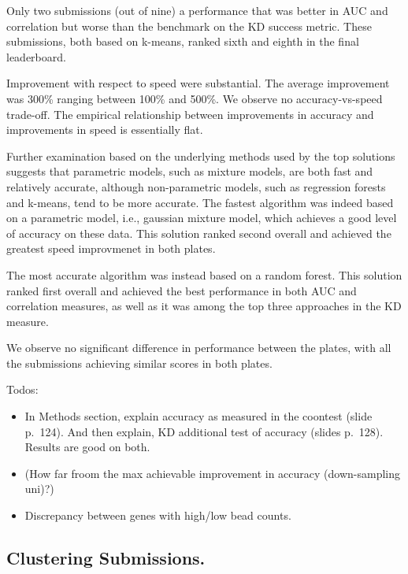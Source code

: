 \documentclass[]{article}
\providecommand{\tightlist}{%
  \setlength{\itemsep}{0pt}\setlength{\parskip}{0pt}}
\begin{document}
Only two submissions (out of nine) a performance that was better in AUC
and correlation but worse than the benchmark on the KD success metric.
These submissions, both based on k-means, ranked sixth and eighth in the
final leaderboard.

Improvement with respect to speed were substantial. The average
improvement was 300\% ranging between 100\% and 500\%. We observe no
accuracy-vs-speed trade-off. The empirical relationship between
improvements in accuracy and improvements in speed is essentially flat.

Further examination based on the underlying methods used by the top
solutions suggests that parametric models, such as mixture models, are
both fast and relatively accurate, although non-parametric models, such
as regression forests and k-means, tend to be more accurate. The fastest
algorithm was indeed based on a parametric model, i.e., gaussian mixture
model, which achieves a good level of accuracy on these data. This
solution ranked second overall and achieved the greatest speed
improvmenet in both plates.

The most accurate algorithm was instead based on a random forest. This
solution ranked first overall and achieved the best performance in both
AUC and correlation measures, as well as it was among the top three
approaches in the KD measure.

We observe no significant difference in performance between the plates,
with all the submissions achieving similar scores in both plates.

\color{red}

Todos:

\begin{itemize}
\tightlist
\item
  In Methods section, explain accuracy as measured in the coontest
  (slide p.~124). And then explain, KD additional test of accuracy
  (slides p.~128). Results are good on both.
\item
  (How far froom the max achievable improvement in accuracy
  (down-sampling uni)?)
\item
  Discrepancy between genes with high/low bead counts.
\end{itemize}

\color{black}

\hypertarget{clustering-submissions.}{%
\subsection{Clustering Submissions.}\label{clustering-submissions.}}
\end{document}
